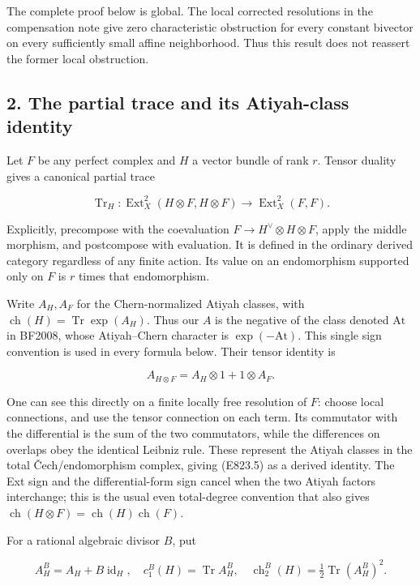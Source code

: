 The complete proof below is global. The local corrected resolutions in
the compensation note give zero characteristic obstruction for every
constant bivector on every sufficiently small affine neighborhood. Thus
this result does not reassert the former local obstruction.

\subsection{2. The partial trace and its Atiyah-class
identity}\label{SF-E823-the-partial-trace-and-its-atiyah-class-identity}

Let \(F\) be any perfect complex and \(H\) a vector bundle of rank
\(r\). Tensor duality gives a canonical partial trace

\[
 \operatorname{Tr}_H:
 \operatorname{Ext}^2_X(H\otimes F,H\otimes F)
       \longrightarrow\operatorname{Ext}^2_X(F,F).
 \tag{E823.4}
\]

Explicitly, precompose with the coevaluation
\(F\to H^\vee\otimes H\otimes F\), apply the middle morphism, and
postcompose with evaluation. It is defined in the ordinary derived
category regardless of any finite action. Its value on an endomorphism
supported only on \(F\) is \(r\) times that endomorphism.

Write \(A_H,A_F\) for the Chern-normalized Atiyah classes, with
\(\operatorname{ch}(H)=\operatorname{Tr}\exp(A_H)\). Thus our \(A\) is
the negative of the class denoted \(\mathrm{At}\) in BF2008, whose
Atiyah--Chern character is \(\exp(-\mathrm{At})\). This single sign
convention is used in every formula below. Their tensor identity is

\[
 A_{H\otimes F}=A_H\otimes1+1\otimes A_F.
 \tag{E823.5}
\]

One can see this directly on a finite locally free resolution of \(F\):
choose local connections, and use the tensor connection on each term.
Its commutator with the differential is the sum of the two commutators,
while the differences on overlaps obey the identical Leibniz rule. These
represent the Atiyah classes in the total Čech/endomorphism complex,
giving (E823.5) as a derived identity. The Ext sign and the
differential-form sign cancel when the two Atiyah factors interchange;
this is the usual even total-degree convention that also gives
\(\operatorname{ch}(H\otimes F)=
\operatorname{ch}(H)\operatorname{ch}(F)\).

For a rational algebraic divisor \(B\), put

\[
 A_H^B=A_H+B\operatorname{id}_H,
 \quad c_1^B(H)=\operatorname{Tr}A_H^B,
 \quad \operatorname{ch}_2^B(H)=
       \tfrac12\operatorname{Tr}(A_H^B)^2.
 \tag{E823.6}
\]

